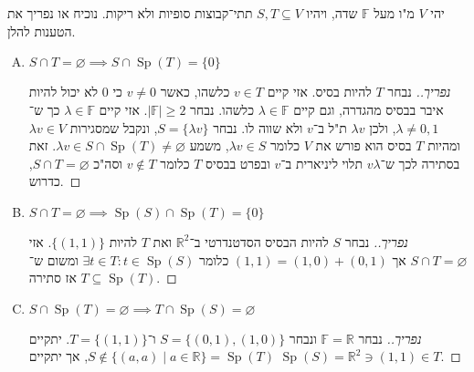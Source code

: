 \documentclass[]{article}
\newcommand\R     {\mathbb{R}}
\DeclareMathOperator{\Sp}     {Sp}
\newcommand\F         {\mathbb{F}}
\newcommand\co        {\colon}
\renewcommand\lg      {\lambda}
\begin{document}
	\section{}
	יהי $V$ מ"ו מעל $\F$ שדה, ויהיו $S, T \subseteq V$ תתי־קבוצות סופיות ולא ריקות. נוכיח או נפריך את הטענות להלן. 
	\begin{enumerate}[A)]
		\item $S \cap T = \varnothing \implies S \cap \Sp(T) = \{0\}$ \begin{proof}[נפריך.]
			נבחר $T$ להיות בסיס. אזי קיים $v \in T$ כלשהו, כאשר $v \neq 0$ כי $0$ לא יכול להיות איבר בבסיס מהגדרה, וגם קיים $\lg \in \F$ כלשהו. נבחר $|\F| \ge 2$. אזי קיים $\lg \in \F$ כך ש־$\lg \neq 0, 1$, ולכן $\lg v$ ת"ל ב־$v$ ולא שווה לו. נבחר $S = \{\lg v\}$, ונקבל שמסגירות $\lg v \in V$ ומהיות $T$ בסיס הוא פורש את $V$ כלומר $\lg v \in S$, משמע $\lg v \in S \cap \Sp(T) \neq \varnothing$. זאת בסתירה לכך ש־$v \lg$ תלוי ליניארית ב־$v$ ובפרט בבסיס $T$ כלומר $v \notin T $ וסה"כ $S \cap T = \varnothing$, כדרוש. 
			
		\end{proof}
		\item $S \cap T = \varnothing \implies \Sp(S) \cap \Sp(T) = \{0\}$ \begin{proof}[נפריך.]
			נבחר $S$ להיות הבסיס הסדטנדרטי ב־$\R^2$ ואת $T$ להיות $\{(1, 1)\}$. אזי $S \cap T = \varnothing$ אך $(1, 1) = (1, 0) + (0, 1)$ כלומר $\exists t \in T \co t \in \Sp(S)$ ומשום ש־$T \subseteq \Sp(T)$ אז סתירה. 
		
		\end{proof}
		\item $S \cap \Sp(T) = \varnothing \implies T \cap \Sp(S) = \varnothing$ \begin{proof}[נפריך.]
			נבחר $\F = \R$ ונבחר $S = \{(0, 1), (1, 0)\}$ ו־$T = \{(1, 1)\}$. יתקיים $S \notin \{(a, a) \mid a \in \R\} = \Sp(T)$, אך יתקיים $\Sp(S) = \R^2 \ni (1, 1) \in T$. 
		\end{proof}
	\end{enumerate}
	
\end{document}
